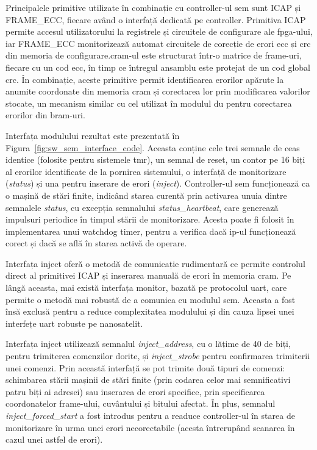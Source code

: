 \documentclass[12pt,a4paper]{report}
\begin{document}
Principalele primitive utilizate în combinație cu controller-ul \gls{sem} sunt ICAP și FRAME\_ECC, fiecare având o interfață dedicată pe controller. Primitiva ICAP permite accesul utilizatorului la registrele și circuitele de configurare ale \gls{fpga}-ului, iar FRAME\_ECC monitorizează automat circuitele de corecție de erori \gls{ecc} și \gls{crc} din memoria de configurare.\@ \gls{cram}-ul este structurat într-o matrice de frame-uri, fiecare cu un cod \gls{ecc},  în timp ce întregul ansamblu este protejat de un cod global \gls{crc}. În combinație, aceste primitive permit identificarea erorilor apărute la anumite coordonate din memoria \gls{cram} și corectarea lor prin modificarea valorilor stocate, un mecanism similar cu cel utilizat în modulul \gls{du} pentru corectarea erorilor din \gls{bram}-uri.

Interfața modulului rezultat este prezentată în Figura~\ref{fig:sw_sem_interface_code}. Aceasta conține cele trei semnale de ceas identice (folosite pentru sistemele \gls{tmr}), un semnal de reset,  un contor pe 16 biți al erorilor identificate de la pornirea sistemului, o interfață de monitorizare (\textit{status}) și una pentru inserare de erori (\textit{inject}). Controller-ul \gls{sem} funcționează ca o mașină de stări finite, indicând starea curentă prin activarea unuia dintre semnalele \textit{status}, cu excepția semnalului \textit{status\_heartbeat}, care generează impulsuri periodice în timpul stării de monitorizare. Acesta poate fi folosit în implementarea unui watchdog timer, pentru a verifica dacă \gls{ip}-ul funcționează corect și dacă se află în starea activă de operare.

Interfața inject oferă o metodă de comunicație rudimentară ce permite controlul direct al primitivei ICAP și inserarea manuală de erori în memoria \gls{cram}. Pe lângă aceasta, mai există interfața monitor, bazată pe protocolul \gls{uart}, care permite o metodă mai robustă de a comunica cu modulul \gls{sem}. Aceasta a fost însă exclusă pentru a reduce complexitatea modulului și din cauza lipsei unei interfețe \gls{uart} robuste pe nanosatelit.

Interfața inject utilizează semnalul \textit{inject\_address}, cu o lățime de 40 de biți, pentru trimiterea comenzilor dorite, și \textit{inject\_strobe} pentru confirmarea trimiterii unei comenzi. Prin această interfață se pot trimite două tipuri de comenzi: schimbarea stării mașinii de stări finite (prin codarea celor mai semnificativi patru biți ai adresei) sau inserarea de erori specifice, prin specificarea coordonatelor frame-ului, cuvântului și bitului afectat. În plus, semnalul \textit{inject\_forced\_start} a fost introdus pentru a readuce controller-ul în starea de monitorizare în urma unei erori necorectabile (acesta întrerupând scanarea în cazul unei astfel de erori).
\end{document}
